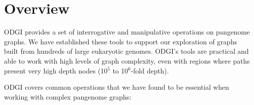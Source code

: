 \documentclass{bioinfo}
\begin{document}

\begin{comment}
key message of the paper is that we have collected a set of algorithms that enable easy use of pangenome graphs for investigating biology
-> build model solves problem of working with big graphs in memory
-> view (convert to GFA) & paths solve problem of exporting basic features of the graph (e.g. paths)
-> stats (understand basic size / structure) & bin & degree & depth solves problem of understanding the overall structure and size of the graph
-> sort (groom) & layout solves problem of finding latent structure in the pangenome
-> viz & draw provides a human-viewable readout of the graph
-> chop & unchop & squeeze & break & prune & explode lets us break apart or combine the graph nodes and topology
-> position & tips & untangle (jaccard based coordinate conversion) provides a way to map coordinates between any genomes in the graph (e.g. liftover!)
-> extract lets us pull out specific regions of the graph based on path ranges, nodes and positions
\end{comment}



\section{Overview}

ODGI provides a set of interrogative and manipulative operations on pangenome graphs.
We have established these tools to support our exploration of graphs built from hundreds of large eukaryotic genomes.
ODGI's tools are practical and able to work with high levels of graph complexity, even with regions where paths present very high depth nodes (10$^5$ to 10$^6$-fold depth).

ODGI covers common operations that we have found to be essential when working with complex pangenome graphs:
\end{document}
